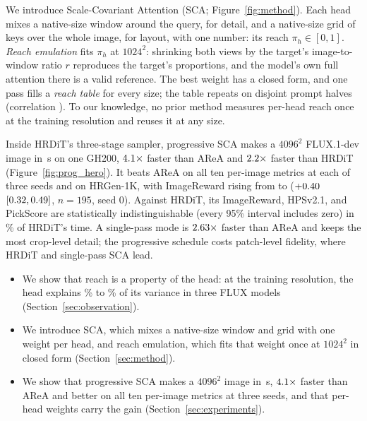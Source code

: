 \documentclass{article} %
\newcommand{\nmain}{195}  %
\newcommand{\sca}{SCA}
\theoremstyle{remark}
\begin{document}
We introduce Scale-Covariant Attention (\sca{}; Figure~\ref{fig:method}). Each head mixes a native-size window around the query, for detail, and a native-size grid of keys over the whole image, for layout, with one number: its reach $\pi_h\in[0,1]$. \emph{Reach emulation} fits $\pi_h$ at $1024^2$: shrinking both views by the target's image-to-window ratio $r$ reproduces the target's proportions, and the model's own full attention there is a valid reference. The best weight has a closed form, and one pass fills a \emph{reach table} for every size; the table repeats on disjoint prompt halves (correlation \hlEmuSplitHalfTwo). To our knowledge, no prior method measures per-head reach once at the training resolution and reuses it at any size.

Inside HRDiT's three-stage sampler, progressive \sca{} makes a $4096^2$ FLUX.1-dev image in \hlSecProg\,s on one GH200, $4.1\times$ faster than AReA and $2.2\times$ faster than HRDiT (Figure~\ref{fig:prog_hero}). It beats AReA on all ten per-image metrics at each of three seeds and on HRGen-1K, with ImageReward rising from \hlAreaIrAbs{} to \hlProgIrAbs{} ($+0.40$ $[0.32,0.49]$, $n=\nmain$, seed 0). Against HRDiT, its ImageReward, HPSv2.1, and PickScore are statistically indistinguishable (every 95\% interval includes zero) in \hlProgHrditPct\% of HRDiT's time. A single-pass mode is $2.63\times$ faster than AReA and keeps the most crop-level detail; the progressive schedule costs patch-level fidelity, where HRDiT and single-pass \sca{} lead.

\noindent\begin{minipage}{\linewidth}
\begin{itemize}[leftmargin=1.3em,itemsep=1pt,topsep=0pt]
  \item We show that reach is a property of the head: at the training resolution, the head explains \hlVarHead\% to \hlVarHeadFluxTwo\% of its variance in three FLUX models (Section~\ref{sec:observation}).
  \item We introduce \sca{}, which mixes a native-size window and grid with one weight per head, and reach emulation, which fits that weight once at $1024^2$ in closed form (Section~\ref{sec:method}).
  \item We show that progressive \sca{} makes a $4096^2$ image in \hlSecProg\,s, $4.1\times$ faster than AReA and better on all ten per-image metrics at three seeds, and that per-head weights carry the gain (Section~\ref{sec:experiments}).
\end{itemize}
\end{minipage}
\end{document}

